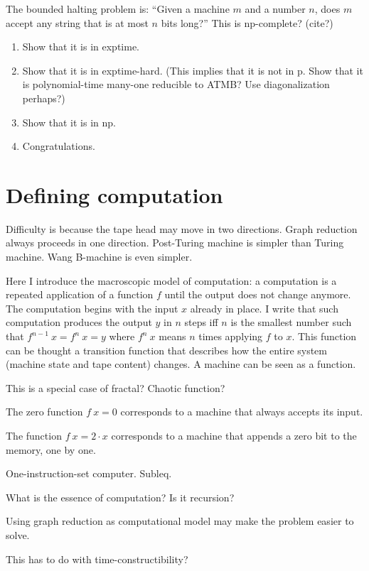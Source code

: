 The bounded halting problem is:
``Given a machine $m$ and a number $n$,
does $m$ accept any string that is at most $n$ bits long?''
This is np-complete? (cite?)

\begin{enumerate}
\item Show that it is in exptime.
\item Show that it is in exptime-hard.
(This implies that it is not in p.
Show that it is polynomial-time many-one reducible to ATMB?
Use diagonalization perhaps?)
\item Show that it is in np.
\item Congratulations.
\end{enumerate}

\section{Defining computation}

Difficulty is because the tape head may move in two directions.
Graph reduction always proceeds in one direction.
Post-Turing machine is simpler than Turing machine.
Wang B-machine is even simpler.

Here I introduce the macroscopic model of computation:
a computation is a repeated application of a function $f$
until the output does not change anymore.
The computation begins with the input $x$ already in place.
I write that such computation produces the output $y$
in $n$ steps iff $n$ is the smallest number such that $f^{n-1}~x = f^n~x = y$
where $f^n~x$ means $n$ times applying $f$ to $x$.
This function can be thought a transition function that describes
how the entire system (machine state and tape content) changes.
A machine can be seen as a function.

This is a special case of fractal? Chaotic function?

The zero function $f~x = 0$ corresponds to a machine
that always accepts its input.

The function $f~x = 2 \cdot x$ corresponds to a machine
that appends a zero bit to the memory, one by one.

One-instruction-set computer.
Subleq.

What is the essence of computation?
Is it recursion?

Using graph reduction as computational model
may make the problem easier to solve.

This has to do with time-constructibility?

